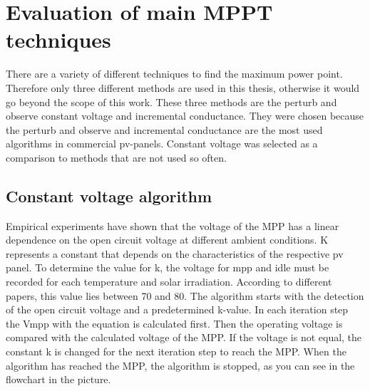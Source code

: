 \section{Evaluation of main MPPT techniques\label{MPPTalgo}}

There are a variety of different techniques to find the maximum power point. Therefore only three different methods are used in this thesis, otherwise it would go beyond the scope of this work. These three methods are the perturb and observe constant voltage and incremental conductance. They were chosen because the perturb and observe and incremental conductance are the most used algorithms in commercial pv-panels. Constant voltage was selected as a comparison to methods that are not used so often. 

\subsection{Constant voltage algorithm}
Empirical experiments have shown that the voltage of the MPP has a linear dependence on the open circuit voltage at different ambient conditions. 
K represents a constant that depends on the characteristics of the respective pv panel. To determine the value for k, the voltage for mpp and idle must be recorded for each temperature and solar irradiation. According to different papers, this value lies between 70 and 80. The algorithm starts with the detection of the open circuit voltage and a predetermined k-value. In each iteration step the Vmpp with the equation is calculated first. Then the operating voltage is compared with the calculated voltage of the MPP. If the voltage is not equal, the constant k is changed for the next iteration step to reach the MPP. When the algorithm has reached the MPP, the algorithm is stopped, as you can see in the flowchart in the picture.

